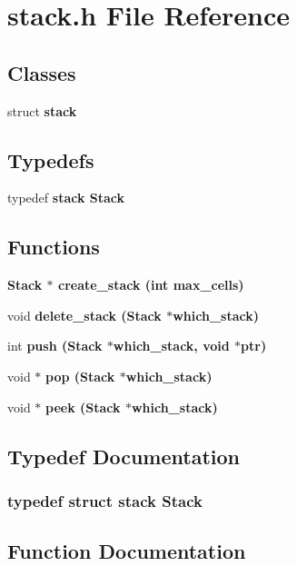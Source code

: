 \section{stack.h File Reference}
\label{stack_8h}
\subsection*{Classes}
\begin{CompactItemize}
\item 
struct \bf{stack}
\end{CompactItemize}
\subsection*{Typedefs}
\begin{CompactItemize}
\item 
typedef \bf{stack} \bf{Stack}
\end{CompactItemize}
\subsection*{Functions}
\begin{CompactItemize}
\item 
\bf{Stack} $\ast$ \bf{create\_\-stack} (int max\_\-cells)
\item 
void \bf{delete\_\-stack} (\bf{Stack} $\ast$which\_\-stack)
\item 
int \bf{push} (\bf{Stack} $\ast$which\_\-stack, void $\ast$ptr)
\item 
void $\ast$ \bf{pop} (\bf{Stack} $\ast$which\_\-stack)
\item 
void $\ast$ \bf{peek} (\bf{Stack} $\ast$which\_\-stack)
\end{CompactItemize}


\subsection{Typedef Documentation}
\subsubsection{\setlength{\rightskip}{0pt plus 5cm}typedef struct \bf{stack} \bf{Stack}}\label{stack_8h_a7883e8bf747b9dedec990b539df2cc0}




\subsection{Function Documentation}
